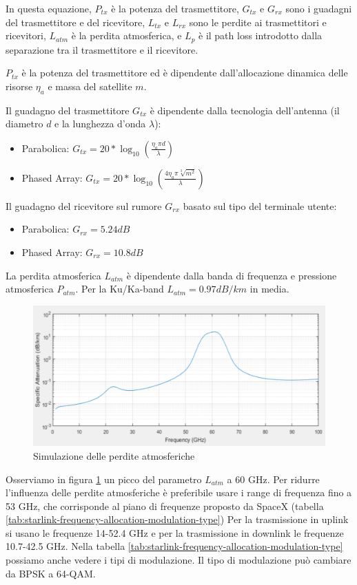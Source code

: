 In questa equazione, $P_{tx}$ è la potenza del trasmettitore, $G_{tx}$ e $G_{rx}$ sono i guadagni del trasmettitore e del ricevitore, $L_{tx}$ e $L_{rx}$ sono le perdite ai trasmettitori e ricevitori, $L_{atm}$ è la perdita atmosferica, e $L_{p}$ è il path loss introdotto dalla separazione tra il trasmettitore e il ricevitore.

$P_{tx}$ è la potenza del trasmettitore ed è dipendente dall'allocazione dinamica delle risorse $\eta_{a}$ e massa del satellite $m$.

Il guadagno del trasmettitore $G_{tx}$ è dipendente dalla tecnologia dell'antenna (il diametro $d$ e la lunghezza d'onda $\lambda$):
\begin{itemize}
  \item Parabolica: $G_{tx} = 20 * \log_{10} (\frac{\eta_{a} \pi d}{\lambda})$
  \item Phased Array: $G_{tx} = 20 * \log_{10} (\frac{4 \eta_{a} \pi \sqrt[3]{m^2}}{\lambda})$
\end{itemize}

Il guadagno del ricevitore sul rumore $G_{rx}$ basato sul tipo del terminale utente:
\begin{itemize}
  \item Parabolica: $G_{rx} = 5.24 dB$
  \item Phased Array: $G_{rx} = 10.8 dB$
\end{itemize}

La perdita atmosferica $L_{atm}$ è dipendente dalla banda di frequenza e pressione atmosferica $P_{atm}$.
Per la Ku/Ka-band $L_{atm} = 0.97 dB/km$ in media.

\begin{figure}[htbp]
  \centering
  \includegraphics[width=0.8\linewidth]{./res/img/atmospheric_losses_simulation.png}
  \caption{Simulazione delle perdite atmosferiche}
  \label{fig:atmospheric-losses-simulation}
\end{figure}

Osserviamo in figura \ref{fig:atmospheric-losses-simulation} un picco del parametro $L_{atm}$ a 60 GHz.
Per ridurre l'influenza delle perdite atmosferiche è preferibile usare i range di frequenza fino a 53 GHz, che corrisponde al piano di frequenze proposto da SpaceX (tabella \ref{tab:starlink-frequency-allocation-modulation-type})
Per la trasmissione in uplink si usano le frequenze 14-52.4 GHz e per la trasmissione in downlink le frequenze 10.7-42.5 GHz.
Nella tabella \ref{tab:starlink-frequency-allocation-modulation-type} possiamo anche vedere i tipi di modulazione.
Il tipo di modulazione può cambiare da \ac{BPSK} a 64-\ac{QAM}.

